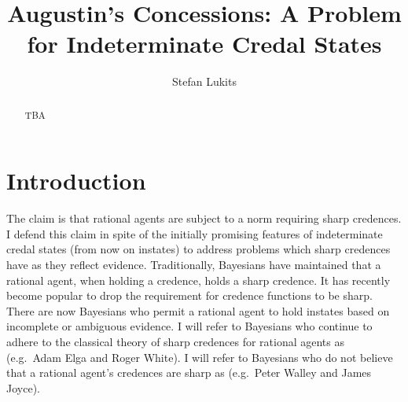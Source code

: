 \documentclass[11pt]{article}
\begin{document}

\title{Augustin's Concessions: A Problem for Indeterminate Credal States}
\author{Stefan Lukits}
\date{}
\maketitle
{}

\begin{abstract} 
TBA
\end{abstract}

\section{Introduction}
\label{Introduction}

The claim is that rational agents are subject to a norm requiring
sharp credences. I defend this claim in spite of the initially
promising features of indeterminate credal states (from now on
instates) to address problems which sharp credences have as they
reflect evidence. Traditionally, Bayesians have maintained that a
rational agent, when holding a credence, holds a sharp credence. It
has recently become popular to drop the requirement for credence
functions to be sharp. There are now Bayesians who permit a rational
agent to hold instates based on incomplete or ambiguous evidence. I
will refer to Bayesians who continue to adhere to the classical theory
of sharp credences for rational agents as  (e.g.\
Adam Elga and Roger White). I will refer to Bayesians who do not
believe that a rational agent's credences are sharp as
 (e.g.\ Peter Walley and James Joyce).
\end{document}
